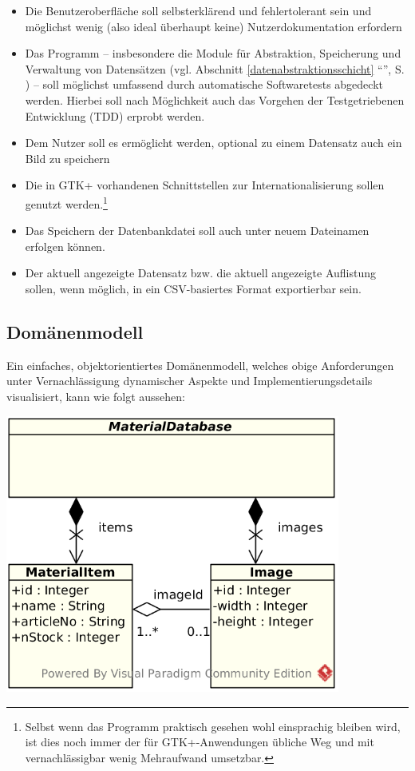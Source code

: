\begin{itemize}
\item Die Benutzeroberfläche soll selbsterklärend und fehlertolerant sein und möglichst wenig (also ideal überhaupt keine)
Nutzerdokumentation erfordern
\item Das Programm -- insbesondere die Module für Abstraktion, Speicherung und Verwaltung von Datensätzen (vgl.
Abschnitt \ref{datenabstraktionsschicht} ``'', S. \pageref{datenabstraktionsschicht})
-- soll möglichst umfassend durch automatische Softwaretests abgedeckt werden.
Hierbei soll nach Möglichkeit auch das Vorgehen der Testgetriebenen Entwicklung (TDD) erprobt werden.
\item Dem Nutzer soll es ermöglicht werden, optional zu einem Datensatz auch ein Bild zu speichern
\item Die in GTK+ vorhandenen Schnittstellen zur Internationalisierung sollen genutzt werden.\footnote{Selbst wenn das
Programm praktisch gesehen wohl einsprachig bleiben wird, ist dies noch immer der für GTK+-Anwendungen übliche Weg
und mit vernachlässigbar wenig Mehraufwand umsetzbar.}
\item Das Speichern der Datenbankdatei soll auch unter neuem Dateinamen erfolgen können.
\item Der aktuell angezeigte Datensatz bzw. die aktuell angezeigte Auflistung sollen, wenn möglich, in ein CSV-basiertes
Format exportierbar sein.
\end{itemize}

\newpage
\subsection{Domänenmodell}
Ein einfaches, objektorientiertes Domänenmodell, welches obige Anforderungen unter Vernachlässigung dynamischer Aspekte
und Implementierungsdetails visualisiert, kann wie folgt aussehen:

\begin{center}
\noindent\includegraphics[width=110mm,keepaspectratio]{images/01-domaenenmodell.png}
\end{center}

